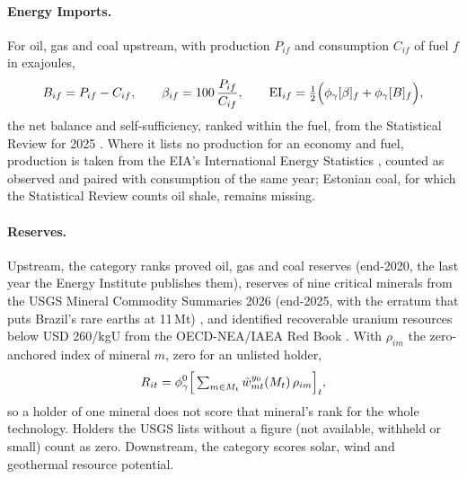 \paragraph{Energy Imports.}\label{subsec:es_imports} For oil, gas and coal upstream, with production
$P_{if}$ and consumption $C_{if}$ of fuel $f$ in exajoules,
\begin{equation}\label{eq:es_imports}
  B_{if}=P_{if}-C_{if},\qquad \beta_{if}=100\,\frac{P_{if}}{C_{if}},\qquad
  \mathrm{EI}_{if}=\tfrac12\Big(\phi_{\gamma}[\beta]_{f}+\phi_{\gamma}[B]_{f}\Big),
\end{equation}
the net balance and self-sufficiency, ranked within the fuel, from the Statistical Review for 2025
\citep{ei2026statistical}. Where it lists no production for an economy and fuel, production is
taken from the EIA's International Energy Statistics \citep{eia2026international}, counted as
observed and paired with consumption of the same year; Estonian coal, for which the Statistical
Review counts oil shale, remains missing.

\paragraph{Reserves.}\label{subsec:es_reserves} Upstream, the category ranks proved oil, gas and
coal reserves (end-2020, the last year the Energy Institute publishes them), reserves of nine
critical minerals from the USGS Mineral Commodity Summaries 2026 (end-2025, with the erratum that
puts Brazil's rare earths at 11\,Mt) \citep{usgs2026mcs}, and identified recoverable uranium
resources below USD 260/kgU from the OECD-NEA/IAEA Red Book \citep{oecdnea2026uranium}. With
$\rho_{im}$ the zero-anchored index of mineral $m$, zero for an unlisted holder,
\begin{equation}\label{eq:es_reserves}
  R_{it}=\phi_{\gamma}^{0}\Big[\textstyle\sum_{m\in M_t}\tilde w^{y_0}_{mt}(M_t)\,\rho_{im}\Big]_{t},
\end{equation}
so a holder of one mineral does not score that mineral's rank for the whole technology. Holders
the USGS lists without a figure (not available, withheld or small) count as zero. Downstream, the
category scores solar, wind and geothermal resource potential.

